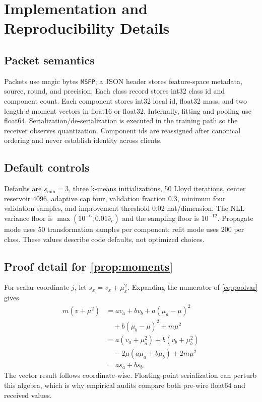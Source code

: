 \section{Implementation and Reproducibility Details}\label{app:repro}
\subsection{Packet semantics}
Packets use magic bytes \texttt{MSFP}; a JSON header stores feature-space metadata, source, round, and precision. Each class record stores int32 class id and component count. Each component stores int32 local id, float32 mass, and two length-$d$ moment vectors in float16 or float32. Internally, fitting and pooling use float64. Serialization/de-serialization is executed in the training path so the receiver observes quantization. Component ids are reassigned after canonical ordering and never establish identity across clients.

\subsection{Default controls}
Defaults are $s_{\min}=3$, three k-means initializations, 50 Lloyd iterations, center reservoir 4096, adaptive cap four, validation fraction 0.3, minimum four validation samples, and improvement threshold 0.02 nat/dimension. The NLL variance floor is $\max(10^{-6},0.01\bar v_c)$ and the sampling floor is $10^{-12}$. Propagate mode uses 50 transformation samples per component; refit mode uses 200 per class. These values describe code defaults, not optimized choices.

\subsection{Proof detail for \cref{prop:moments}}
For scalar coordinate $j$, let $s_x=v_x+\mu_x^2$. Expanding the numerator of \cref{eq:poolvar} gives
\begin{align*}
m(v+\mu^2)&=a v_a+b v_b+a(\mu_a-\mu)^2\\
&\quad+b(\mu_b-\mu)^2+m\mu^2\\
&=a(v_a+\mu_a^2)+b(v_b+\mu_b^2)\\
&\quad-2\mu(a\mu_a+b\mu_b)+2m\mu^2\\
&=a s_a+b s_b.
\end{align*}
The vector result follows coordinate-wise. Floating-point serialization can perturb this algebra, which is why empirical audits compare both pre-wire float64 and received values.


